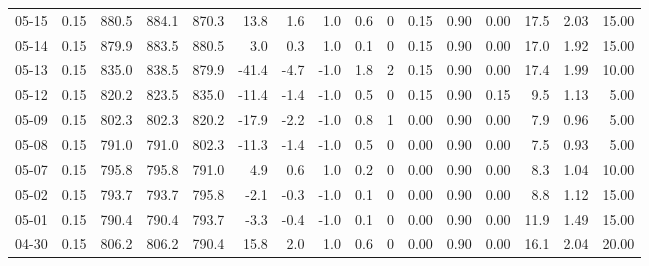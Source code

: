\begin{threeparttable}
{\begin{tabular}{lrrrrrrrrrrrrrrr}
  05-15 &     0.15 & 880.5 & 884.1 & 870.3 &       13.8 &            1.6 &                      1.0 &                 0.6 &              0 &       0.15 &      0.90 &           0.00 &             17.5 &            2.03 &                  15.00 \\
  05-14 &     0.15 & 879.9 & 883.5 & 880.5 &        3.0 &            0.3 &                      1.0 &                 0.1 &              0 &       0.15 &      0.90 &           0.00 &             17.0 &            1.92 &                  15.00 \\
  05-13 &     0.15 & 835.0 & 838.5 & 879.9 &      -41.4 &           -4.7 &                     -1.0 &                 1.8 &              2 &       0.15 &      0.90 &           0.00 &             17.4 &            1.99 &                  10.00 \\
  05-12 &     0.15 & 820.2 & 823.5 & 835.0 &      -11.4 &           -1.4 &                     -1.0 &                 0.5 &              0 &       0.15 &      0.90 &           0.15 &              9.5 &            1.13 &                   5.00 \\
  05-09 &     0.15 & 802.3 & 802.3 & 820.2 &      -17.9 &           -2.2 &                     -1.0 &                 0.8 &              1 &       0.00 &      0.90 &           0.00 &              7.9 &            0.96 &                   5.00 \\
  05-08 &     0.15 & 791.0 & 791.0 & 802.3 &      -11.3 &           -1.4 &                     -1.0 &                 0.5 &              0 &       0.00 &      0.90 &           0.00 &              7.5 &            0.93 &                   5.00 \\
  05-07 &     0.15 & 795.8 & 795.8 & 791.0 &        4.9 &            0.6 &                      1.0 &                 0.2 &              0 &       0.00 &      0.90 &           0.00 &              8.3 &            1.04 &                  10.00 \\
  05-02 &     0.15 & 793.7 & 793.7 & 795.8 &       -2.1 &           -0.3 &                     -1.0 &                 0.1 &              0 &       0.00 &      0.90 &           0.00 &              8.8 &            1.12 &                  15.00 \\
  05-01 &     0.15 & 790.4 & 790.4 & 793.7 &       -3.3 &           -0.4 &                     -1.0 &                 0.1 &              0 &       0.00 &      0.90 &           0.00 &             11.9 &            1.49 &                  15.00 \\
  04-30 &     0.15 & 806.2 & 806.2 & 790.4 &       15.8 &            2.0 &                      1.0 &                 0.6 &              0 &       0.00 &      0.90 &           0.00 &             16.1 &            2.04 &                  20.00 \\

\end{tabular}}
\end{threeparttable}
